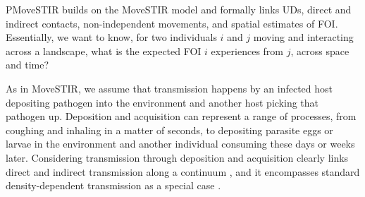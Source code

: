 \documentclass[letterpaper]{article}
\begin{document}
PMoveSTIR builds on the MoveSTIR model \citep{Wilber2022} and formally links UDs, direct and indirect contacts, non-independent movements, and spatial estimates of FOI. Essentially, we want to know, for two individuals $i$ and $j$ moving and interacting across a landscape, what is the expected FOI $i$ experiences from $j$, across space and time? 

As in MoveSTIR, we assume that transmission happens by an infected host depositing pathogen into the environment and another host picking that pathogen up. 
Deposition and acquisition can represent a range of processes, from coughing and inhaling in a matter of seconds, to depositing parasite eggs or larvae in the environment and another individual consuming these days or weeks later. 
Considering transmission through deposition and acquisition clearly links direct and indirect transmission along a continuum \citep{Wilber2022}, and it encompasses standard density-dependent transmission as a special case \citep{Cortez2021}. 
\end{document}

